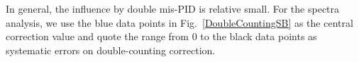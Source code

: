 

In general, the influence by double mis-PID is relative small. For the spectra analysis, we use the blue data points in Fig.~\ref{DoubleCountingSB} as the central correction value and quote the range from 0 to the black data points as systematic errors on double-counting correction.
